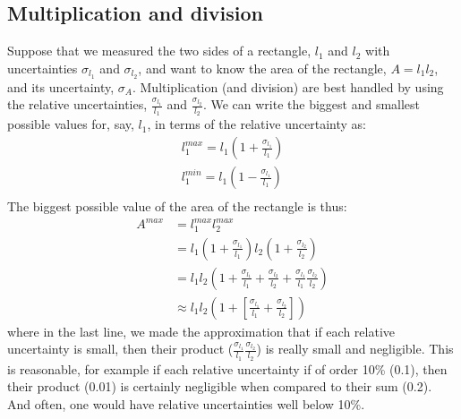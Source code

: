 \subsection{Multiplication and division}
Suppose that we measured the two sides of a rectangle, $l_1$ and $l_2$ with uncertainties $\sigma_{l_1}$ and $\sigma_{l_2}$, and want to know the area of the rectangle, $A=l_1l_2$, and its uncertainty, $\sigma_{A}$. Multiplication (and division) are best handled by using the relative uncertainties, $\frac{\sigma_{l_1}}{l_1}$ and $\frac{\sigma_{l_2}}{l_2}$. We can write the biggest and smallest possible values for, say, $l_1$, in terms of the relative uncertainty as:
\begin{align}
l_1^{max}=l_1\left(1+\frac{\sigma_{l_1}}{l_1}\right)\nonumber\\
l_1^{min}=l_1\left(1-\frac{\sigma_{l_1}}{l_1}\right)\nonumber\\
\end{align}
The biggest possible value of the area of the rectangle is thus:
\begin{align}
A^{max}&=l_1^{max}l_2^{max}\nonumber\\
  &=l_1\left(1+\frac{\sigma_{l_1}}{l_1}\right)l_2\left(1+\frac{\sigma_{l_2}}{l_2}\right)\nonumber\\
  &=l_1l_2\left(1+\frac{\sigma_{l_1}}{l_1}+\frac{\sigma_{l_2}}{l_2}+\frac{\sigma_{l_1}}{l_1}\frac{\sigma_{l_2}}{l_2}\right)\nonumber\\
  &\approx l_1l_2\left(1+\left[\frac{\sigma_{l_1}}{l_1}+\frac{\sigma_{l_2}}{l_2}\right]\right)
\end{align}
where in the last line, we made the approximation that if each relative uncertainty is small, then their product ($\frac{\sigma_{l_1}}{l_1}\frac{\sigma_{l_2}}{l_2}$) is really small and negligible. This is reasonable, for example if each relative uncertainty if of order 10\% (0.1), then their product (0.01) is certainly negligible when compared to their sum (0.2). And often, one would have relative uncertainties well below 10\%.

